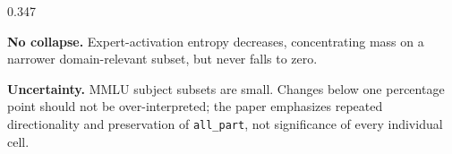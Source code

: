\documentclass[final]{beamer}
\newcommand{\PosterSans}{\notosans}
\begin{document}
\begin{frame}[t]
\begin{columns}[T,onlytextwidth]
\begin{column}{0.347\textwidth}
\begin{minipage}[t][88cm][s]{\linewidth}
\begin{PosterBox}[
  title={5. Resource accounting and router behavior},
  colframe=PosterTeal,colbacktitle=TealTint,coltitle=PosterGreen,
  fontupper=\PosterSans\fontsize{19.0}{23.0}\selectfont]
\begin{tcbraster}[raster columns=2,raster column skip=2.7mm,raster equal height=rows]
\begin{MicroCard}[colback=PurpleTint,colframe=PosterPurple!55,fontupper=\PosterSans\fontsize{18}{22}\selectfont]
\textbf{No collapse.} Expert-activation entropy decreases, concentrating mass on a narrower domain-relevant subset, but never falls to zero.
\end{MicroCard}
\end{tcbraster}
\vspace{1.5mm}
\begin{tcolorbox}[microcard,colback=GoldTint,colframe=PosterGold!55,fontupper=\PosterSans\fontsize{18}{22}\selectfont]
\textbf{Uncertainty.} MMLU subject subsets are small. Changes below one percentage point should not be over-interpreted; the paper emphasizes repeated directionality and preservation of \texttt{all\_part}, not significance of every individual cell.
\end{tcolorbox}
\end{PosterBox}

\end{minipage}
\end{column}
\end{columns}


\end{frame}
\end{document}
